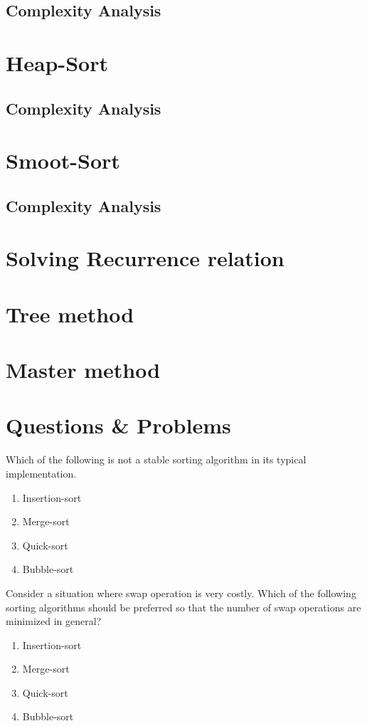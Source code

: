 \subsection{Complexity Analysis}

\section{Heap-Sort}

\subsection{Complexity Analysis}

\section{Smoot-Sort}

\subsection{Complexity Analysis}


\section{Solving Recurrence relation}
\section{Tree method}
\section{Master method}

\section{Questions \& Problems}
\begin{problem}
Which of the following is not a stable sorting algorithm in its typical implementation.
\begin{enumerate}
\item Insertion-sort
\item Merge-sort
\item Quick-sort
\item Bubble-sort
\end{enumerate}

\end{problem}

\begin{problem}
Consider a situation where swap operation is very costly. Which of the following sorting algorithms should be preferred so that the number of swap operations are minimized in general?
\begin{enumerate}
\item Insertion-sort
\item Merge-sort
\item Quick-sort
\item Bubble-sort
\end{enumerate}

\end{problem}



